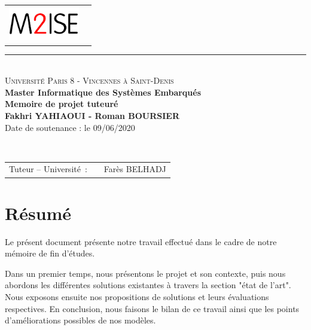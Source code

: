 \documentclass[a4paper, 12pt]{report}
\begin{document}
\begin{titlepage}
  \begin{center}
    \begin{tabular*}{\textwidth}{l@{\extracolsep{\fill}}r}
      \includegraphics[height=1.5cm]{images/m2ise.png}
    \end{tabular*}
    \small 
    \rule{\textwidth}{.5pt}~\\
    \large 
    \textsc{Université Paris 8 - Vincennes à Saint-Denis}\vspace{0.5cm}\\
    \textbf{Master Informatique des Systèmes Embarqués}\vspace{3.0cm}\\
    \Large
    \textbf{Memoire de projet tuteuré}\vspace{1.5cm}\\
    \large
    \textbf{Fakhri \textsc{YAHIAOUI} - Roman \textsc{BOURSIER}}\vspace{1.5cm}\\
    Date de soutenance : le 09/06/2020\vspace{1.75cm}\\
  \end{center}\vspace{1.5cm}~\\
  \begin{tabular}{ll}
    \hspace{-0.45cm}Tuteur -- Université~:~&~Farès \textsc{BELHADJ}\\
  \end{tabular}
\end{titlepage}
\chapter*{Résumé}

Le présent document présente notre travail effectué dans le cadre de notre mémoire de fin d'études.

Dans un premier temps, nous présentons le projet et son contexte, puis nous abordons les différentes solutions existantes à travers la section "état de l'art". Nous exposons ensuite nos propositions de solutions et leurs évaluations respectives. En conclusion, nous faisons le bilan de ce travail ainsi que les points d'améliorations possibles de nos modèles.
\end{document}
